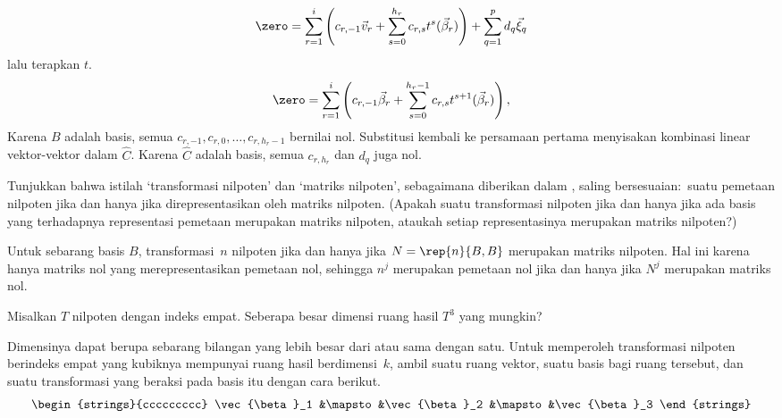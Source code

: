 \begin{exercises}
\begin{answer}
\begin{equation*}
        \zero=
        \sum_{r=1}^{i}\left(c_{r,-1}\vec v_r
          +\sum_{s=0}^{h_r}c_{r,s}t^s(\vec\beta_r)\right)
          +\sum_{q=1}^{p}d_q\vec\xi_q
      \end{equation*}
      lalu terapkan \( t \).
      \begin{multline*}
        \zero=
        \sum_{r=1}^{i}\left(c_{r,-1}\vec\beta_r
          +\sum_{s=0}^{h_r-1}c_{r,s}t^{s+1}(\vec\beta_r)\right),
      \end{multline*}
      Karena \(B\) adalah basis, semua
      \(c_{r,-1},c_{r,0},\dots,c_{r,h_r-1}\) bernilai nol.
      Substitusi kembali ke persamaan pertama menyisakan kombinasi linear
      vektor-vektor dalam \(\hat C\). Karena \(\hat C\) adalah basis,
      semua \(c_{r,h_r}\) dan \(d_q\) juga nol.
    \end{answer}
  \item \label{exer:MatNilIffMapNil} 
    Tunjukkan bahwa istilah `transformasi nilpoten' dan `matriks nilpoten',
    sebagaimana diberikan dalam , saling
    bersesuaian:~suatu pemetaan nilpoten jika dan hanya jika direpresentasikan
    oleh matriks nilpoten.
    (Apakah suatu transformasi nilpoten jika dan hanya jika ada basis yang
    terhadapnya representasi pemetaan merupakan matriks nilpoten, ataukah
    setiap representasinya merupakan matriks nilpoten?)
    \begin{answer}
      Untuk sebarang basis $B$,
      transformasi~$n$ nilpoten jika dan hanya jika
      $N=\rep{n}{B,B}$ merupakan matriks nilpoten.
      Hal ini karena hanya matriks nol yang merepresentasikan pemetaan nol,
      sehingga \( n^j \) merupakan pemetaan nol jika dan hanya jika \( N^j \)
      merupakan matriks nol.
    \end{answer}
  \item 
    Misalkan \( T \) nilpoten dengan indeks empat.
    Seberapa besar dimensi ruang hasil \( T^3 \) yang mungkin?
    \begin{answer}
      Dimensinya dapat berupa sebarang bilangan yang lebih besar dari atau
      sama dengan satu.
      Untuk memperoleh transformasi nilpoten berindeks empat yang kubiknya
      mempunyai ruang hasil berdimensi~$k$, ambil suatu ruang vektor,
      suatu basis bagi ruang tersebut, dan suatu transformasi yang beraksi
      pada basis itu dengan cara berikut.
      \begin{equation*}
         \begin{strings}{ccccccccc}
            \vec{\beta}_1 &\mapsto &\vec{\beta}_2 &\mapsto &\vec{\beta}_3

\end{strings}
\end{equation*}
\end{answer}
\end{exercises}
